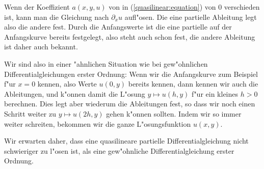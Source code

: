 Wenn der Koeffizient $a(x,y,u)$ von 
in (\ref{quasilinear:equation})
von $0$ verschieden ist, kann man die Gleichung
nach $\partial_xu$ aufl"osen.
Die eine partielle Ableitung legt also die andere fest.
Durch die Anfangswerte ist die eine partielle auf der
Anfangskurve bereits festgelegt, also steht auch schon fest,
die andere Ableitung ist daher auch bekannt. 

Wir sind also in einer "ahnlichen Situation wie bei gew"ohnlichen
Differentialgleichungen erster Ordnung: Wenn wir die 
Anfangskurve zum Beispiel f"ur $x=0$ kennen, also Werte
$u(0,y)$ bereits kennen, dann kennen wir
auch die Ableitungen, und k"onnen damit die L"osung
$y\mapsto u(h, y)$ f"ur ein kleines $h>0$ berechnen. Dies legt aber
wiederum die Ableitungen fest, so dass wir noch einen Schritt 
weiter zu $y\mapsto u(2h,y)$ gehen k"onnen sollten.
Indem wir so immer weiter schreiten, bekommen wir die ganze
L"osungsfunktion $u(x,y)$.

Wir erwarten daher, dass eine quasilineare partielle Differentialgleichung
nicht schwieriger zu l"osen ist, als eine gew"ohnliche Differentialgleichung
erster Ordnung.

